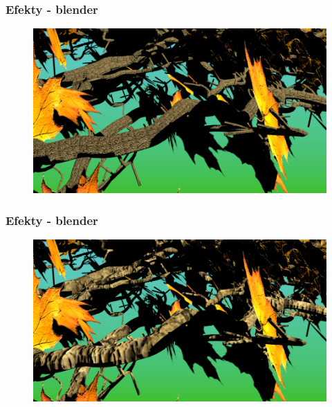 \documentclass[blue,table]{beamer}
\begin{document}
\begin{frame}\frametitle{Efekty - blender}
\begin{figure}
\includegraphics[scale=0.4]{img/blender/blender14.png} 
\end{figure}
\end{frame}
\begin{frame}\frametitle{Efekty - blender}
\begin{figure}
\includegraphics[scale=0.4]{img/blender/blender15.png} 
\end{figure}
\end{frame}
\end{document}
